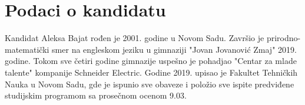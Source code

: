 \documentclass[11pt]{article}
\begin{document}
\newpage
\section{Podaci o kandidatu}


Kandidat Aleksa Bajat rođen je 2001. godine u Novom Sadu. Završio je prirodno-matematički smer na engleskom jeziku 
u gimnaziji "Jovan Jovanović Zmaj" 2019. godine. Tokom sve četiri godine gimnazije uspešno je pohadjao 
"Centar za mlade talente" kompanije Schneider Electric.  Godine 2019. upisao je Fakultet 
Tehničkih Nauka u Novom Sadu, gde je ispunio sve obaveze i položio sve ispite predviđene 
studijskim programom sa prosečnom ocenom 9.03.
\end{document}
